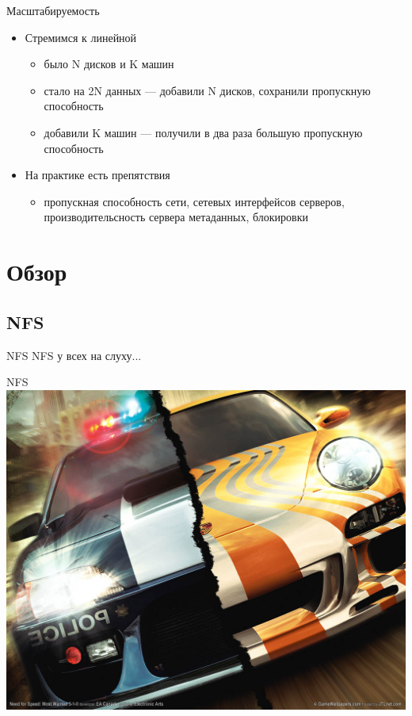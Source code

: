 \documentclass[sans]{beamer}
\begin{document}
\begin{frame}{Масштабируемость}
	\begin{itemize}
		\item Стремимся к линейной
			\begin{itemize}
				\item было {\color{blue} N} дисков и {\color{magenta} K} машин
				\item стало на {\color{blue} 2N} данных --- добавили {\color{blue} N} дисков, сохранили пропускную способность
				\item добавили {\color{magenta} K} машин --- получили в два раза большую пропускную способность
			\end{itemize}
		\item На практике есть препятствия
		\begin{itemize}
			\item пропускная способность сети, сетевых интерфейсов серверов, производительсность сервера метаданных, блокировки
		\end{itemize}
	\end{itemize}
\end{frame}


\section{Обзор}

\subsection{NFS}

\begin{frame}{NFS}
	NFS у всех на слуху...
\end{frame}

\begin{frame}{NFS}
	\includegraphics[width = \linewidth]{images/nfs.png}
\end{frame}
\end{document}
